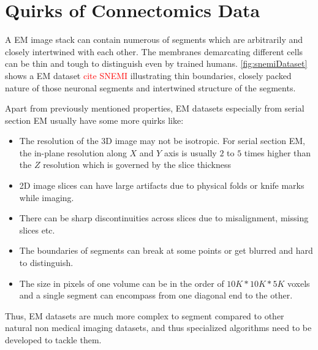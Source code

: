 \section{Quirks of Connectomics Data}
A EM image stack can contain numerous of segments which are arbitrarily and closely intertwined with each other. The membranes demarcating different cells can be thin and tough to distinguish even by trained humans. \autoref{fig:snemiDataset} shows a EM dataset \textcolor{red}{cite SNEMI} illustrating thin boundaries, closely packed nature of those neuronal segments and intertwined structure of the segments.

Apart from previously mentioned properties, EM datasets especially from serial section EM usually have some more quirks like:
\begin{itemize}
  \item The resolution of the 3D image may not be isotropic. For serial section EM, the in-plane resolution along $X$ and $Y$ axis is usually $2$ to $5$ times higher than the $Z$ resolution which is governed by the slice thickness 
  \item 2D image slices can have large artifacts due to physical folds or knife marks while imaging.
  \item There can be sharp discontinuities across slices due to misalignment, missing slices etc.
  \item The boundaries of segments can break at some points or get blurred and hard to distinguish.
  \item The size in pixels of one volume can be in the order of $10K*10K*5K$ voxels and a single segment can encompass from one diagonal end to the other.
\end{itemize}

Thus, EM datasets are much more complex to segment compared to other natural non medical imaging datasets, and thus specialized algorithms need to be developed to tackle them.


